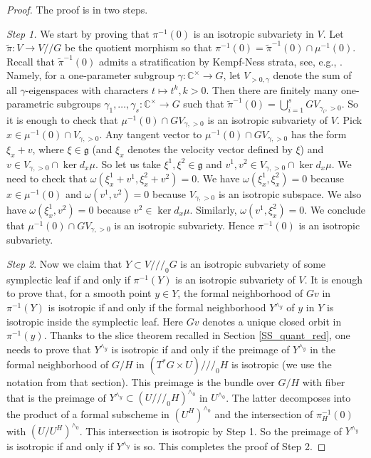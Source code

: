 \documentclass[12pt]{amsart}
\newcommand{\K}{\mathbb{C}}
\newcommand{\g}{\mathfrak{g}}
\newcommand{\red}{/\!/\!/}
\newcommand{\quo}{/\!/}
\theoremstyle{definition}
\begin{document}
\begin{proof}
The proof is in two steps.

{\it Step 1.} We start by proving that $\pi^{-1}(0)$ is an isotropic subvariety in $V$.
Let $\tilde{\pi}:V\rightarrow V\quo G$ be the quotient morphism so that $\pi^{-1}(0)=
\tilde{\pi}^{-1}(0)\cap\mu^{-1}(0)$. Recall that $\tilde{\pi}^{-1}(0)$ admits a
stratification by Kempf-Ness strata, see, e.g., \cite[Section 5.6]{PV}. Namely, for a one-parameter subgroup
$\gamma:\K^\times \rightarrow G$, let $V_{>0,\gamma}$ denote the sum of all
$\gamma$-eigenspaces with characters $t\mapsto t^k, k>0$. Then there are finitely many
one-parametric subgroups $\gamma_1,\ldots,\gamma_s:\K^\times \rightarrow G$ such that
$\tilde{\pi}^{-1}(0)=\bigcup_{i=1}^s GV_{\gamma_i,>0}$. So it is enough to check that
$\mu^{-1}(0)\cap GV_{\gamma,>0}$ is an isotropic subvariety of $V$.
Pick $x\in \mu^{-1}(0)\cap V_{\gamma,>0}$. Any  tangent vector to $\mu^{-1}(0)\cap GV_{\gamma,>0}$
has the form $\xi_x+ v$, where $\xi\in \g$ (and $\xi_x$ denotes the velocity vector
defined by $\xi$) and $v\in V_{\gamma,>0}\cap \ker d_x\mu$. So let us take
$\xi^1,\xi^2\in \g$ and $v^1,v^2\in V_{\gamma,>0}\cap \ker d_x\mu$. We need
to check that
$\omega(\xi^1_x+v^1, \xi^2_x+v^2)=0$. We have $\omega(\xi^1_x,\xi^2_x)=0$ because
$x\in \mu^{-1}(0)$ and $\omega(v^1,v^2)=0$ because $V_{\gamma,>0}$ is an isotropic
subspace. We also have $\omega(\xi^1_x,v^2)=0$ because $v^2\in \ker d_x \mu$.
Similarly, $\omega(v^1,\xi^2_x)=0$. We conclude that $\mu^{-1}(0)\cap GV_{\gamma,>0}$
is an isotropic subvariety. Hence $\pi^{-1}(0)$ is an isotropic subvariety.

{\it Step 2}. Now we claim that $Y\subset V\red_0 G$ is an isotropic subvariety
of some symplectic leaf if and only if $\pi^{-1}(Y)$ is an isotropic subvariety of $V$.
It is enough to prove that, for a smooth point $y\in Y$, the formal neighborhood of $Gv$ in $\pi^{-1}(Y)$
is isotropic if and only if the formal neighborhood $Y^{\wedge_y}$ of $y$ in $Y$ is isotropic
inside the symplectic leaf. Here $Gv$ denotes a unique closed orbit in $\pi^{-1}(y)$. Thanks to the slice theorem
recalled in Section \ref{SS_quant_red}, one needs to prove that $Y^{\wedge_y}$ is isotropic
if and only if the preimage of $Y^{\wedge_y}$ in the formal neighborhood of $G/H$ in $(T^*G\times U)\red_0 H$
is isotropic (we use the notation from that section). This preimage is the bundle over $G/H$ with fiber that is the
preimage of $Y^{\wedge_y}\subset (U\red_0 H)^{\wedge_0}$ in $U^{\wedge_0}$. The latter decomposes into the product
of a formal subscheme in $(U^H)^{\wedge_0}$ and the intersection of
$\pi_H^{-1}(0)$ with $(U/U^H)^{\wedge_0}$. This intersection is isotropic by Step 1.
So the preimage of $Y^{\wedge_y}$ is isotropic if and only if $Y^{\wedge_y}$ is so.
This completes the proof of Step 2.
 \end{proof}
\end{document}
